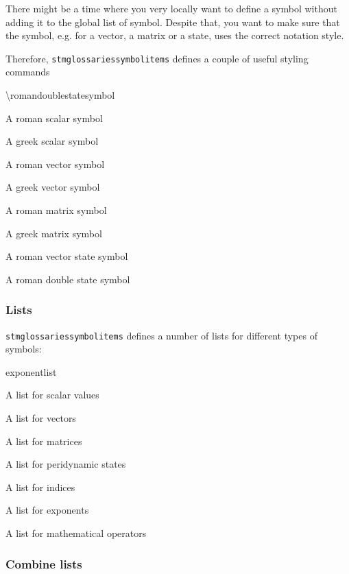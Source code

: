 \documentclass{scrartcl}
\begin{document}
There might be a time where you very locally want to define a symbol without adding it to the global list of symbol. Despite that, you want to make sure that the symbol, e.g. for a vector, a matrix or a state, uses the correct notation style.

Therefore, \texttt{stmglossariessymbolitems} defines a couple of useful styling commands

\begin{labeling}{\textbackslash romandoublestatesymbol}
\item [\textbackslash romanscalarsymbol] A roman scalar symbol
\item [\textbackslash greekscalarsymbol] A greek scalar symbol
\item [\textbackslash romanvectorsymbol] A roman vector symbol
\item [\textbackslash greekvectorsymbol] A greek vector symbol
\item [\textbackslash romanmatrixsymbol] A roman matrix symbol
\item [\textbackslash scalarstatesymbol] A greek matrix symbol
\item [\textbackslash romanvectorstatesymbol] A roman vector state symbol
\item [\textbackslash romandoublestatesymbol] A roman double state symbol
\end{labeling}

\subsubsection{Lists}
\label{sec:usage:symbols:document:lists}

\texttt{stmglossariessymbolitems} defines a number of lists for different types of symbols:

\begin{labeling}{exponentlist}
\item [scalarlist] A list for scalar values
\item [vectorlist] A list for vectors
\item [matrixlist] A list for matrices
\item [statelist] A list for peridynamic states
\item [indexlist] A list for indices
\item [exponentlist] A list for exponents
\item [operatorlist] A list for mathematical operators
\end{labeling}

\subsubsection{Combine lists}
\label{sec:usage:symbols:document:combinelists}
\end{document}
